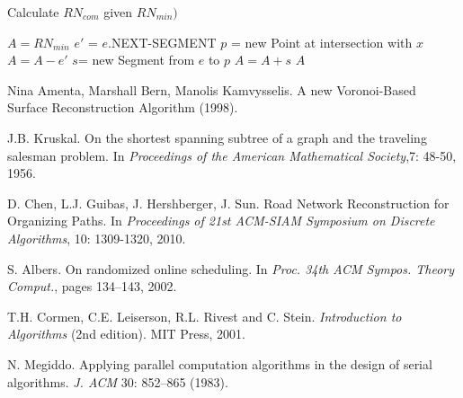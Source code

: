 \documentclass[11pt]{article}
\begin{document}
\begin{algorithm}
\caption{Calculate $RN_{com}$ given $RN_{min})$}
\begin{algorithmic} 
\STATE $A= RN_{min}$
\STATE $e'$ = $e$.NEXT-SEGMENT
\STATE $p$ = new Point at intersection with $x$
\STATE $A=A-e'$
\STATE $s$= new Segment from $e$ to $p$
\STATE $A=A+s$
\ENDIF
\ENDIF
\ENDIF
\ENDFOR
\RETURN $A$
\end{algorithmic}
\label{alg:RNcomalg}
\end{algorithm}



\begin{thebibliography}{50}

Nina Amenta, Marshall Bern, Manolis Kamvysselis.
A new Voronoi-Based Surface Reconstruction Algorithm
(1998).

J.B. Kruskal.
On the shortest spanning subtree of a graph and the traveling salesman problem.
In \emph{Proceedings of the American Mathematical Society},7: 48-50, 1956.

D. Chen, L.J. Guibas, J. Hershberger, J. Sun.
Road Network Reconstruction for Organizing Paths.
In \emph{Proceedings  of  21st  ACM-SIAM  Symposium  on  Discrete  Algorithms}, 10: 1309-1320, 2010.

S. Albers.
On randomized online scheduling.
In \emph{Proc. 34th ACM Sympos. Theory Comput.}, pages 134--143, 2002.

T.H. Cormen, C.E. Leiserson, R.L. Rivest and C. Stein.
\emph{Introduction to Algorithms} (2nd edition).
MIT Press, 2001.

N. Megiddo.
Applying parallel computation algorithms in the design of serial algorithms.
\emph{J. ACM} 30: 852--865 (1983).

\end{thebibliography}
\end{document}
